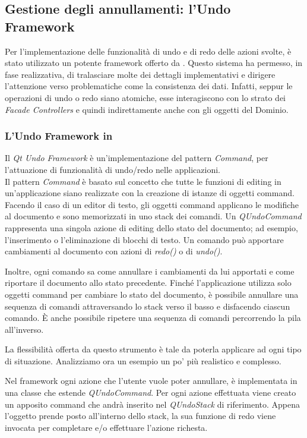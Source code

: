 \subsection{Gestione degli annullamenti: l'Undo Framework}
Per l'implementazione delle funzionalità di undo e di redo delle azioni svolte, è stato utilizzato un potente framework offerto da \qt{}. Questo sistema ha permesso, in fase realizzativa, di tralasciare molte dei dettagli implementativi e dirigere l'attenzione verso problematiche come la consistenza dei dati. Infatti, seppur le operazioni di undo o redo siano atomiche, esse interagiscono con lo strato dei \emph{Facade Controllers} e quindi indirettamente anche con gli oggetti del Dominio.

\subsubsection*{L'Undo Framework in \qt{}}
Il \emph{Qt Undo Framework} è un'implementazione del pattern \emph{Command}\cite{AUPL04}, per l'attuazione di funzionalità di undo/redo nelle applicazioni.\\
Il pattern \emph{Command} è basato sul concetto che tutte le funzioni di editing in un'applicazione siano realizzate con la creazione di istanze di oggetti command. Facendo il caso di un editor di testo, gli oggetti command applicano le modifiche al documento e sono memorizzati in uno stack dei comandi. Un \emph{QUndoCommand} rappresenta una singola azione di editing dello stato del documento; ad esempio, l'inserimento o l'eliminazione di blocchi di testo. Un comando può apportare cambiamenti al documento con azioni di \emph{redo()} o di \emph{undo()}.

Inoltre, ogni comando sa come annullare i cambiamenti da lui apportati e come riportare il documento allo stato precedente. Finché l'applicazione utilizza solo oggetti command per cambiare lo stato del documento, è possibile annullare una sequenza di comandi attraversando lo stack verso il basso e disfacendo ciascun comando. È anche possibile ripetere una sequenza di comandi percorrendo la pila all'inverso.

La flessibilità offerta da questo strumento è tale da poterla applicare ad ogni tipo di situazione. Analizziamo ora un esempio un po' più realistico e complesso.

Nel framework ogni azione che l'utente vuole poter annullare, è implementata in una classe che estende \emph{QUndoCommand}. Per ogni azione effettuata viene creato un apposito command che andrà inserito nel \emph{QUndoStack} di riferimento. Appena l'oggetto prende posto all'interno dello stack, la sua funzione di redo viene invocata per completare e/o effettuare l'azione richesta.

